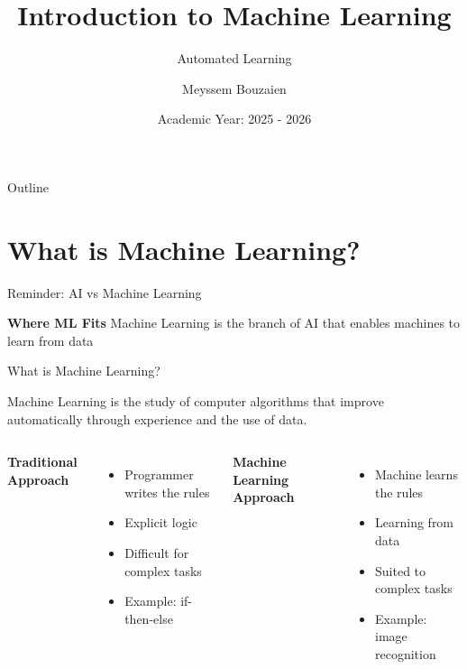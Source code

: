 \documentclass[12pt,aspectratio=169]{beamer}
\title[Introduction to ML]{Introduction to Machine Learning}
\subtitle{Automated Learning}
\author{Meyssem Bouzaien}
\date{Academic Year: 2025 - 2026}
\begin{document}
\begin{frame}
\titlepage
\end{frame}

\begin{frame}{Outline}
\tableofcontents
\end{frame}

\section{What is Machine Learning?}

\begin{frame}{Reminder: AI vs Machine Learning}
\begin{center}
\end{center}

\textbf{Where ML Fits}
Machine Learning is the branch of AI that enables machines to learn from data
\end{frame}

\begin{frame}{What is Machine Learning?}
\begin{definition}
Machine Learning is the study of computer algorithms that improve automatically through experience and the use of data.
\end{definition}


\begin{columns}[T]
\textbf{Traditional Approach}
\begin{itemize}
\item Programmer writes the rules
\item Explicit logic
\item Difficult for complex tasks
\item Example: if-then-else
\end{itemize}

\textbf{Machine Learning Approach}
\begin{itemize}
\item Machine learns the rules
\item Learning from data
\item Suited to complex tasks
\item Example: image recognition
\end{itemize}
\end{columns}
\end{frame}
\end{document}
